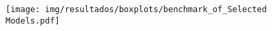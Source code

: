 \begin{figure}[h!]
	\texttt{[image: img/resultados/boxplots/benchmark\_of\_Selected Models.pdf]}
	\caption{}
	\label{fig:Time_of_Selected Models}
\end{figure}

